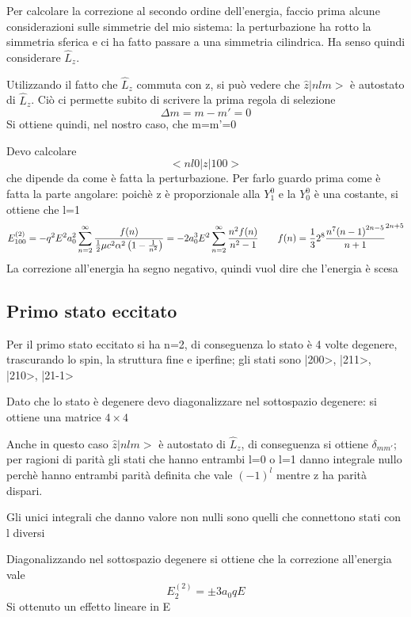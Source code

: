 \noindent Per calcolare la correzione al secondo ordine dell'energia, faccio prima alcune considerazioni sulle simmetrie del mio sistema: la perturbazione ha rotto la simmetria sferica e ci ha fatto passare a una simmetria cilindrica. 
Ha senso quindi considerare \(\hat{L}_z\).

\noindent Utilizzando il fatto che \(\hat{L}_z\) commuta con z, si può vedere che \(\hat{z}|nlm>\) è autostato di \(\hat{L}_z\). Ciò ci permette subito di scrivere la prima regola di selezione
\begin{equation*}
    \Delta m = m-m' = 0
\end{equation*}
Si ottiene quindi, nel nostro caso, che m=m'=0

\noindent Devo calcolare
\begin{equation*}
    <nl0|z|100>
\end{equation*}
che dipende da come è fatta la perturbazione. \newline
Per farlo guardo prima come è fatta la parte angolare: poichè z è proporzionale alla \(Y^0_1\) e la \(Y^0_0\) è una costante, si ottiene che l=1 
\begin{equation*}
    E_{100}^{(2)} = -q^2E^2a_0^2 \sum_{n=2}^\infty \frac{f(n)}{\frac{1}{2}\mu c^2 \alpha^2 \left(1-\frac{1}{n^2}\right)} = - 2 a_0^3 E^2 \sum_{n=2}^\infty \frac{n^2 f(n)}{n^2-1} \qquad f(n) = \frac{1}{3} 2^8 \frac{n^7 {(n-1)}^{2n-5}}{{n+1}}^{2n+5}
\end{equation*}
La correzione all'energia ha segno negativo, quindi vuol dire che l'energia è scesa

\subsection*{Primo stato eccitato}

Per il primo stato eccitato si ha n=2, di conseguenza lo stato è 4 volte degenere, trascurando lo spin, la struttura fine e iperfine;
gli stati sono |200>, |211>, |210>, |21-1>

\noindent Dato che lo stato è degenere devo diagonalizzare nel sottospazio degenere: si ottiene una matrice \(4 \times 4\)

\noindent Anche in questo caso \(\hat{z}|nlm>\)  è autostato di \(\hat{L}_z\), di conseguenza si ottiene \(\delta_{mm'}\); per ragioni di parità gli stati che hanno entrambi l=0 o l=1 danno integrale nullo perchè hanno entrambi parità definita che vale \({(-1)}^l\) mentre z ha parità dispari. 

\noindent Gli unici integrali che danno valore non nulli sono quelli che connettono stati con l diversi

\noindent Diagonalizzando nel sottospazio degenere si ottiene che la correzione all'energia vale 
\begin{equation*}
    E_2^{(2)} = \pm 3 a_0 qE
\end{equation*}
Si ottenuto un effetto lineare in E